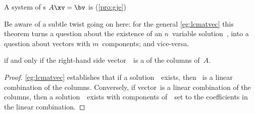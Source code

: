 \begin{theorem} \label{thm:conlincom} 
A system of s \(A\xv=\bv\) is  (\autoref{pro:gje}) 
\begin{aside}
Be aware of a subtle twist going on here: for the general \autoref{eg:lcmatvec} this theorem turns a question about the existence of an \(n\)~variable solution~\xv, into a question about vectors with \(m\)~components; and vice-versa.
\end{aside}%
if and only if the right-hand side vector~\bv\ is a  of the columns of~\(A\).
\end{theorem}

\begin{proof} 
\autoref{eg:lcmatvec} establishes that if a solution~\xv\ exists, then \bv~is a linear combination of the columns.
Conversely, if vector~\bv is a linear combination of the columns, then a solution~\xv\ exists with components of~\xv\ set to the coefficients in the linear combination.
\end{proof}


